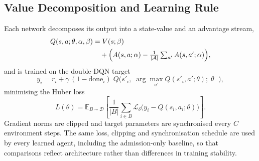 \documentclass[10pt,journal,comsoc]{IEEEtran}
\begin{document}
\subsection{Value Decomposition and Learning Rule}
Each network decomposes its output into a state-value and an advantage
stream,
\begin{align}
Q(s,a;\theta,\alpha,\beta) &= V(s;\beta) \notag\\
&\quad + \Bigl( A(s,a;\alpha) - \tfrac{1}{|\mathcal{A}|}\textstyle\sum_{a'} A(s,a';\alpha) \Bigr),
\label{eq:duel}
\end{align}
and is trained on the double-DQN target
\begin{equation}
y_i = r_i + \gamma\,(1-\text{done}_i)\;
Q\bigl(s'_i,\; \arg\max_{a'} Q(s'_i,a';\theta);\; \theta^{-}\bigr),
\label{eq:target}
\end{equation}
minimising the Huber loss
\begin{equation}
L(\theta) = \mathbb{E}_{B\sim\mathcal{D}}
\left[ \frac{1}{|B|}\sum_{i\in B} \mathcal{L}_{\delta}\bigl(y_i - Q(s_i,a_i;\theta)\bigr) \right].
\label{eq:loss}
\end{equation}
Gradient norms are clipped and target parameters are synchronised every
$C$ environment steps. The same loss, clipping and synchronisation
schedule are used by every learned agent, including the admission-only
baseline, so that comparisons reflect architecture rather than
differences in training stability.
\end{document}
